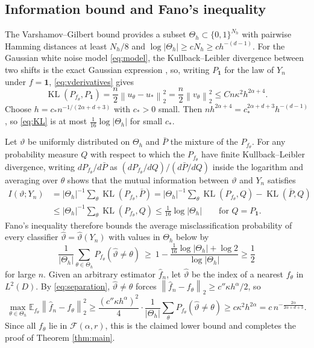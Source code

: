 \documentclass[12pt]{article}
\numberwithin{equation}{section}
\newcommand{\E}{\mathbb E}
\newcommand{\norm}[1]{\left\|#1\right\|}
\newcommand{\KL}{\operatorname{KL}}
\begin{document}
\subsection{Information bound and Fano's inequality}

The Varshamov--Gilbert bound \cite[Lemma 2.9]{Tsybakov} provides a
subset $\Theta_h\subset\{0,1\}^{N_h}$ with pairwise Hamming distances
at least $N_h/8$ and $\log|\Theta_h|\ge cN_h\ge ch^{-(d-1)}$. For the
Gaussian white noise model \eqref{eq:model}, the Kullback--Leibler
divergence between two shifts is the exact Gaussian expression
\cite[equation (6.16)]{GN}, so, writing $P_{\mathbf 1}$ for the law
of $Y_n$ under $f=\mathbf 1$, \eqref{eq:vderivatives} gives
\begin{equation}\label{eq:KL}
 \KL(P_{f_\theta},P_{\mathbf 1})
       =\frac n2\norm{u_\theta-u_*}_2^2
       =\frac n2\norm{v_\theta}_2^2
       \le Cn\kappa^2h^{2\alpha+4}.
\end{equation}
Choose $h=c_*n^{-1/(2\alpha+d+3)}$ with $c_*>0$ small. Then
$nh^{2\alpha+4}=c_*^{2\alpha+d+3}h^{-(d-1)}$, so \eqref{eq:KL} is at
most $\tfrac1{16}\log|\Theta_h|$ for small $c_*$.

Let $\vartheta$ be uniformly distributed on $\Theta_h$ and $\bar P$
the mixture of the $P_{f_\theta}$. For any probability measure $Q$
with respect to which the $P_{f_\theta}$ have finite Kullback--Leibler
divergence, writing $dP_{f_\theta}/d\bar P$ as
$(dP_{f_\theta}/dQ)/(d\bar P/dQ)$ inside the logarithm and averaging
over $\theta$ shows that the mutual information between $\vartheta$
and $Y_n$ satisfies
\begin{align*}
 I(\vartheta;Y_n)
 &=|\Theta_h|^{-1}\textstyle\sum_\theta\KL(P_{f_\theta},\bar P)
 =|\Theta_h|^{-1}\sum_\theta\KL(P_{f_\theta},Q)-\KL(\bar P,Q)\\
 &\le|\Theta_h|^{-1}\textstyle\sum_\theta\KL(P_{f_\theta},Q)
 \le\tfrac1{16}\log|\Theta_h|\qquad\text{for }Q=P_{\mathbf 1}.
\end{align*}
Fano's inequality \cite[Lemma 2.10 and Corollary 2.6]{Tsybakov} therefore
bounds the average misclassification probability of every classifier
$\widehat\vartheta=\widehat\vartheta(Y_n)$ with values in $\Theta_h$
below by
\[
 \frac1{|\Theta_h|}\sum_{\theta\in\Theta_h}
 P_{f_\theta}(\widehat\vartheta\ne\theta)\ \ge\
 1-\frac{\frac1{16}\log|\Theta_h|+\log 2}{\log|\Theta_h|}
 \ge \frac12
\]
for large $n$. Given an arbitrary estimator $\widehat f_n$, let
$\widehat\vartheta$ be the index of a nearest $f_\theta$ in $L^2(D)$.
By \eqref{eq:separation}, $\widehat\vartheta\ne\theta$ forces
$\norm{\widehat f_n-f_\theta}_2\ge c''\kappa h^\alpha/2$, so
\[
 \max_{\theta\in\Theta_h}\E_{f_\theta}\norm{\widehat f_n-f_\theta}_2^2
 \ge\frac{(c''\kappa h^\alpha)^2}4\cdot
 \frac1{|\Theta_h|}\sum_\theta P_{f_\theta}(\widehat\vartheta\ne\theta)
 \ge c\kappa^2h^{2\alpha}=c\,n^{-\frac{2\alpha}{2\alpha+d+3}} .
\]
Since all $f_\theta$ lie in $\mathcal F(\alpha,r)$, this is the claimed
lower bound and completes the proof of Theorem \ref{thm:main}.
\end{document}
